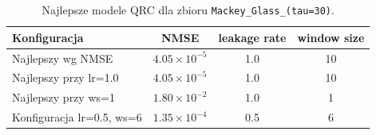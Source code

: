 \begin{table}[ht]
\centering
\caption{Najlepsze modele QRC dla zbioru \texttt{Mackey\_Glass\_(tau=30)}.}
\label{tab:qrc-mackey_glass__tau_30}
\begin{tabular}{lccc}
\toprule
Konfiguracja & NMSE & leakage rate & window size \\
\midrule
Najlepszy wg NMSE & $4.05 \times 10^{-5}$ & 1.0 & 10 \\
Najlepszy przy lr=1.0 & $4.05 \times 10^{-5}$ & 1.0 & 10 \\
Najlepszy przy ws=1 & $1.80 \times 10^{-2}$ & 1.0 & 1 \\
Konfiguracja lr=0.5, ws=6 & $1.35 \times 10^{-4}$ & 0.5 & 6 \\
\bottomrule
\end{tabular}
\end{table}